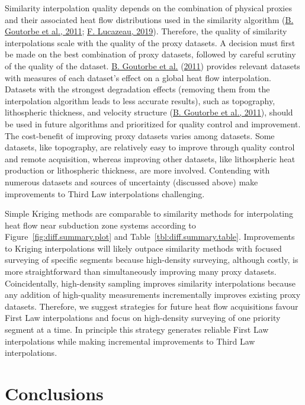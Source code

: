 \documentclass[draft,linenumbers]{agujournal2018}
\begin{document}
Similarity interpolation quality depends on the combination of physical
proxies and their associated heat flow distributions used in the
similarity algorithm (\protect\hyperlink{ref-goutorbe2011}{B. Goutorbe
et al., 2011}; \protect\hyperlink{ref-lucazeau2019}{F. Lucazeau, 2019}).
Therefore, the quality of similarity interpolations scale with the
quality of the proxy datasets. A decision must first be made on the best
combination of proxy datasets, followed by careful scrutiny of the
quality of the dataset. \protect\hyperlink{ref-goutorbe2011}{B. Goutorbe
et al.} (\protect\hyperlink{ref-goutorbe2011}{2011}) provides relevant
datasets with measures of each dataset's effect on a global heat flow
interpolation. Datasets with the strongest degradation effects (removing
them from the interpolation algorithm leads to less accurate results),
such as topography, lithospheric thickness, and velocity structure
(\protect\hyperlink{ref-goutorbe2011}{B. Goutorbe et al., 2011}), should
be used in future algorithms and prioritized for quality control and
improvement. The cost-benefit of improving proxy datasets varies among
datasets. Some datasets, like topography, are relatively easy to improve
through quality control and remote acquisition, whereas improving other
datasets, like lithospheric heat production or lithospheric thickness,
are more involved. Contending with numerous datasets and sources of
uncertainty (discussed above) make improvements to Third Law
interpolations challenging.

Simple Kriging methods are comparable to similarity methods for
interpolating heat flow near subduction zone systems according to
Figure~\ref{fig:diff.summary.plot} and
Table~\ref{tbl:diff.summary.table}. Improvements to Kriging
interpolations will likely outpace similarity methods with focused
surveying of specific segments because high-density surveying, although
costly, is more straightforward than simultaneously improving many proxy
datasets. Coincidentally, high-density sampling improves similarity
interpolations because any addition of high-quality measurements
incrementally improves existing proxy datasets. Therefore, we suggest
strategies for future heat flow acquisitions favour First Law
interpolations and focus on high-density surveying of one priority
segment at a time. In principle this strategy generates reliable First
Law interpolations while making incremental improvements to Third Law
interpolations.

\section{Conclusions}
\end{document}
